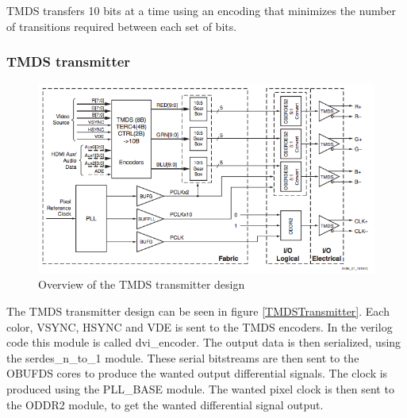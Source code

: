 TMDS transfers 10 bits at a time using an encoding that minimizes the number of transitions required between each set of bits.

\subsubsection{TMDS transmitter}
\begin{figure}
    \includegraphics{img/TMDStransmitterdesign.png}
    \caption{Overview of the TMDS transmitter design}
    \label{fig:TMDSTransmitter}
\end{figure}
The TMDS transmitter design can be seen in figure \ref{TMDSTransmitter}. Each color, VSYNC, HSYNC and VDE is sent to the TMDS encoders. In the verilog code this module is called dvi_encoder. The output data is then serialized, using the serdes_n_to_1 module. These serial bitstreams are then sent to the OBUFDS cores to produce the wanted output differential signals. The clock is produced using the PLL_BASE module. The wanted pixel clock is then sent to the ODDR2 module, to get the wanted differential signal output.

